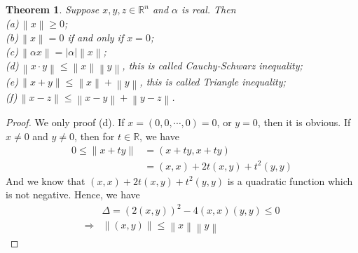 \documentclass[12pt,leqno]{amsart}
\newtheorem{theorem}{Theorem}[section]
\theoremstyle{definition}
\begin{document}
\begin{theorem}
Suppose $x,y,z\in\mathbb{R}^n$ and $\alpha$ is real. Then \medskip \\
\hspace*{1em}(a)\,$\left\|x\right\|\geq 0$;\\
\hspace*{1em}(b)\,$\left\|x\right\| = 0$ if and only if $x = 0$;\\
\hspace*{1em}(c)\,$\left\|\alpha x\right\| = |\alpha|\left\|x\right\|$;\\
\hspace*{1em}(d)\,$\left\|x\cdot y\right\| \leq \left\|x\right\|  \left\|y\right\|$, this is called Cauchy-Schwarz inequality;\\
\hspace*{1em}(e)\,$\left\|x + y\right\| \leq \left\|x\right\| + \left\|y\right\|$, this is called Triangle inequality;\\
\hspace*{1em}(f)\,$\left\|x - z\right\| \leq \left\|x - y\right\| + \left\|y - z\right\|$.
\end{theorem}
\begin{proof}
We only proof (d). If $x = (0,0,\cdots,0) = 0$, or $y = 0$, then it is obvious. If $x \neq 0$ and $y\neq 0$, then for $t\in\mathbb{R}$, we have 
\begin{align*}
    0 \leq \left\|x+ty\right\| & = (x+ty, x+ty) \\
    & = (x,x) + 2t (x,y) + t^2(y,y)
\end{align*}
And we know that $(x,x) + 2t (x,y) + t^2(y,y)$ is a quadratic function which is not negative. Hence, we have 
\begin{align*}
    & \Delta = \left(2(x,y)\right)^2 - 4 (x,x)(y,y) \leq 0 \\
    \Rightarrow & \left\|(x,y)\right\| \leq \left\|x\right\|  \left\|y\right\|
\end{align*}
\end{proof}
\end{document}
